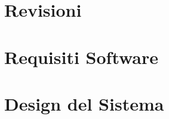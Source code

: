 \documentclass[a4paper,12pt]{report}
\begin{document}
\tableofcontents %



\chapter{Revisioni}

\chapter{Requisiti Software}

\chapter{Design del Sistema}





\end{document}
